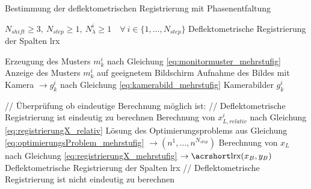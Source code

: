 \begin{algorithm}[H]
\caption{Bestimmung der deflektometrischen Registrierung mit Phasenentfaltung}
	\label{alg:bestimmungDeflektometrischeRegistrierung}
	\begin{algorithmic}[1]
		\Require $N_{shift} \geq 3, ~N_{step} \geq 1, ~N_\lambda^i \geq 1 \quad\forall ~i \in \lbrace 1,\ldots,N_{step} \rbrace$
		\Ensure Deflektometrische Registrierung der Spalten \acrshort{lrx}
		
		\Statex		
		
					\State Erzeugung des Musters $m_k^i$ nach Gleichung \ref{eq:monitormuster_mehrstufig}
					\State Anzeige des Musters $m_k^i$ auf geeignetem Bildschirm
					\State Aufnahme des Bildes mit Kamera $\rightarrow g_k^i$ nach Gleichung \ref{eq:kamerabild_mehrstufig}
				\EndFor
			\EndFor
			\State \Return Kamerabilder $g_k^i$
		\EndProcedure
		
		\Statex
		
			\State // Überprüfung ob eindeutige Berechnung möglich ist:
				\State \textcolor{OliveGreen}{// Deflektometrische Registrierung ist eindeutig zu berechnen}
						\State Berechnung von $x_{L,relativ}^i$ nach Gleichung \ref{eq:registrierungX_relativ}
					\EndFor
					\State Lösung des Optimierungsproblems aus Gleichung \ref{eq:optimierungsProblem_mehrstufig} $\rightarrow (n^1,\ldots, n^{N_{step}})$
					\State Berechnung von $x_L$ nach Gleichung \ref{eq:registrierungX_mehrstufig} $\rightarrow \acrshortmath{lrx}(x_B, y_B)$
				\EndFor
				\State \Return Deflektometrische Registrierung der Spalten \acrshort{lrx}
			\Else
				\State \textcolor{OliveGreen}{// Deflektometrische Registrierung ist nicht eindeutig zu berechnen}
				\State \Return
			\EndIf
		\EndProcedure
	\end{algorithmic}
\end{algorithm}